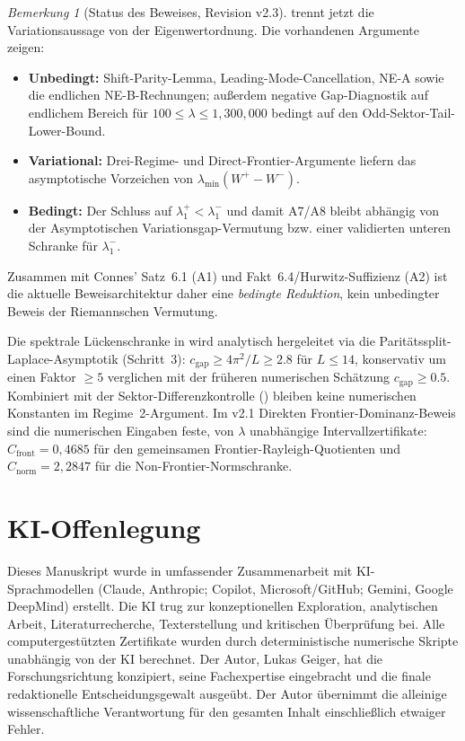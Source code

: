 ﻿\documentclass[12pt,a4paper]{article}
\theoremstyle{definition}
\theoremstyle{remark}
\newtheorem{remark}[theorem]{Bemerkung}
\begin{document}
\begin{remark}[Status des Beweises, Revision v2.3]
\label{rem:M1-status}
 trennt jetzt die Variationsaussage von der Eigenwertordnung. Die vorhandenen Argumente zeigen:
\begin{itemize}
  \item \textbf{Unbedingt:} Shift-Parity-Lemma, Leading-Mode-Cancellation, NE-A sowie die endlichen NE-B-Rechnungen; außerdem negative Gap-Diagnostik auf endlichem Bereich für $100\leq\lambda\leq1{,}300{,}000$ bedingt auf den Odd-Sektor-Tail-Lower-Bound.
  \item \textbf{Variational:} Drei-Regime- und Direct-Frontier-Argumente liefern das asymptotische Vorzeichen von $\lambda_{\min}(W^+-W^-)$.
  \item \textbf{Bedingt:} Der Schluss auf $\lambda_1^+<\lambda_1^-$ und damit A7/A8 bleibt abhängig von der Asymptotischen Variationsgap-Vermutung bzw. einer validierten unteren Schranke für $\lambda_1^-$.
\end{itemize}
Zusammen mit Connes' Satz~6.1 (A1) und Fakt~6.4/Hurwitz-Suffizienz (A2) ist die aktuelle Beweisarchitektur daher eine \emph{bedingte Reduktion}, kein unbedingter Beweis der Riemannschen Vermutung.

Die spektrale Lückenschranke in  wird analytisch hergeleitet via die Paritätssplit-Laplace-Asymptotik (Schritt~3): $c_{\mathrm{gap}} \geq 4\pi^2/L \geq 2.8$ für $L \leq 14$, konservativ um einen Faktor $\geq 5$ verglichen mit der früheren numerischen Schätzung $c_{\mathrm{gap}} \geq 0.5$. Kombiniert mit der Sektor-Differenzkontrolle () bleiben keine numerischen Konstanten im Regime~2-Argument. Im v2.1 Direkten Frontier-Dominanz-Beweis sind die numerischen Eingaben feste, von $\lambda$ unabhängige Intervallzertifikate: $C_{\mathrm{front}}=0{,}4685$ für den gemeinsamen Frontier-Rayleigh-Quotienten und $C_{\mathrm{norm}}=2{,}2847$ für die Non-Frontier-Normschranke.
\end{remark}


\section*{KI-Offenlegung}

Dieses Manuskript wurde in umfassender Zusammenarbeit mit KI-Sprachmodellen (Claude, Anthropic; Copilot, Microsoft/GitHub; Gemini, Google DeepMind) erstellt. Die KI trug zur konzeptionellen Exploration, analytischen Arbeit, Literaturrecherche, Texterstellung und kritischen \"Uberpr\"ufung bei. Alle computergest\"utzten Zertifikate wurden durch deterministische numerische Skripte unabh\"angig von der KI berechnet. Der Autor, Lukas Geiger, hat die Forschungsrichtung konzipiert, seine Fachexpertise eingebracht und die finale redaktionelle Entscheidungsgewalt ausge\"ubt. Der Autor \"ubernimmt die alleinige wissenschaftliche Verantwortung f\"ur den gesamten Inhalt einschlie\ss lich etwaiger Fehler.




\end{document}
